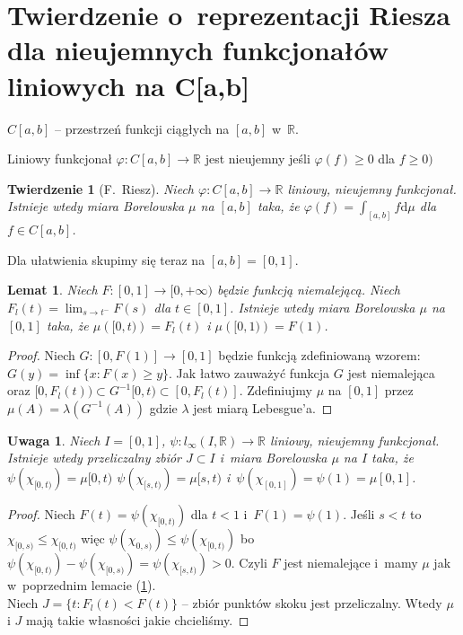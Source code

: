 \documentclass[11pt]{mwrep}
\renewcommand{\[}{\begin{equation}}
\renewcommand{\]}{\end{equation}}
\newcommand{\R}{{\ensuremath{\mathbb R}}}
\newcommand{\dd}{\mathrm{d}}
\newtheorem{twr}[subsection]{Twierdzenie}%
\newtheorem{lem}[subsection]{Lemat}
\newtheorem{uw}[subsection]{Uwaga}
\begin{document}
\section{Twierdzenie o~reprezentacji  Riesza dla nieujemnych funkcjonałów liniowych na C[a,b]}
$C[a,b]$ -- przestrzeń funkcji ciągłych na $[a,b]$ w~$\R$.\par
Liniowy funkcjonał $\varphi:C[a,b]\to \R$ jest nieujemny jeśli $\varphi(f)\ge 0$ dla $f \ge 0)$
\begin{twr}[F.~Riesz]
Niech $\varphi:C[a,b]\to \R$ liniowy, nieujemny  funkcjonał.
Istnieje wtedy miara Borelowska $\mu$ na $[a,b]$ taka, że $\varphi(f) = \int_{[a,b]} f \dd \mu$ dla $f\in C[a,b]$.
\end{twr}
Dla ułatwienia skupimy się teraz na $[a,b]=[0,1]$.
\begin{lem} \label{lem:Riesz1}
  Niech $F\colon[0,1]\to [0,+\infty)$ będzie funkcją niemalejącą. Niech $F_l(t) = \lim_{s\to t^-} F(s)$ dla $t\in[0,1]$. 
  Istnieje wtedy miara Borelowska $\mu$ na $[0,1]$
  taka, że $\mu\left( [0,t) \right) = F_{l}(t)$ i $\mu\left( [0,1) \right) = F(1)$.
\end{lem}
\begin{proof}
			Niech $G\colon[0,F(1)] \to [0,1]$ będzie funkcją zdefiniowaną wzorem: $G(y) = \inf\{x: F(x) \ge y\}$.
			Jak łatwo zauważyć funkcja $G$ jest niemalejąca oraz  $[0,F_l(t)) \subset G^{-1}[0,t)\subset [0,F_l(t)]$.
			Zdefiniujmy $\mu$ na $[0,1]$ przez $\mu(A) = \lambda(G^{-1}(A))$ gdzie $\lambda$ jest miarą Lebesgue'a.
\end{proof}
\begin{uw}
	Niech $I=[0,1]$, $\psi: l_\infty (I,\R)\to \R$ liniowy, nieujemny  funkcjonał. 
	Istnieje wtedy  przeliczalny zbiór $J\subset I$ i~miara Borelowska $\mu$ na $I$ taka, że $\psi\left(\chi_{[0,t)} \right) = \mu[0,t)$ 
		$\psi \left( \chi_{[s,t)}  \right)  = \mu[s,t)$ i~$\psi(\chi_{[0,1]}) = \psi(1) = \mu[0,1]$.
\end{uw}
\begin{proof}
	Niech $F(t) = \psi\left( \chi_{[0,t)} \right)$ dla $t<1$ i~$F(1) = \psi(1)$.
	Jeśli $s<t$ to $\chi_{[0,s)} \le \chi_{[0,t)}$ więc $\psi\left( \chi_{0,s)} \right) \le \psi \left( \chi_{[0,t)} \right)$
		bo $\psi (\chi_{[0,t)} ) - \psi (\chi_{[0,s)}) = \psi(\chi_{[s,t)}) >0$.
	Czyli $F$ jest niemalejące i~mamy $\mu$ jak w~poprzednim lemacie (\ref{lem:Riesz1}).\\
	Niech $J= \{t: F_l (t) < F(t)\}$ -- zbiór punktów skoku jest przeliczalny. 
	Wtedy $\mu$ i $J$ mają takie własności jakie chcieliśmy. 
\end{proof}
\end{document}
